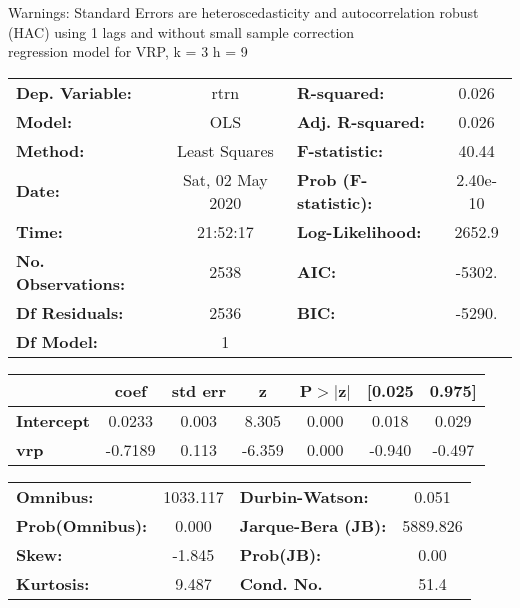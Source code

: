 Warnings: \newline
 [1] Standard Errors are heteroscedasticity and autocorrelation robust (HAC) using 1 lags and without small sample correction\\ 

regression model for VRP, k = 3 h = 9\begin{center}
\begin{tabular}{lclc}
\toprule
\textbf{Dep. Variable:}    &       rtrn       & \textbf{  R-squared:         } &     0.026   \\
\textbf{Model:}            &       OLS        & \textbf{  Adj. R-squared:    } &     0.026   \\
\textbf{Method:}           &  Least Squares   & \textbf{  F-statistic:       } &     40.44   \\
\textbf{Date:}             & Sat, 02 May 2020 & \textbf{  Prob (F-statistic):} &  2.40e-10   \\
\textbf{Time:}             &     21:52:17     & \textbf{  Log-Likelihood:    } &    2652.9   \\
\textbf{No. Observations:} &        2538      & \textbf{  AIC:               } &    -5302.   \\
\textbf{Df Residuals:}     &        2536      & \textbf{  BIC:               } &    -5290.   \\
\textbf{Df Model:}         &           1      & \textbf{                     } &             \\
\bottomrule
\end{tabular}
\begin{tabular}{lcccccc}
                   & \textbf{coef} & \textbf{std err} & \textbf{z} & \textbf{P$> |$z$|$} & \textbf{[0.025} & \textbf{0.975]}  \\
\midrule
\textbf{Intercept} &       0.0233  &        0.003     &     8.305  &         0.000        &        0.018    &        0.029     \\
\textbf{vrp}       &      -0.7189  &        0.113     &    -6.359  &         0.000        &       -0.940    &       -0.497     \\
\bottomrule
\end{tabular}
\begin{tabular}{lclc}
\textbf{Omnibus:}       & 1033.117 & \textbf{  Durbin-Watson:     } &    0.051  \\
\textbf{Prob(Omnibus):} &   0.000  & \textbf{  Jarque-Bera (JB):  } & 5889.826  \\
\textbf{Skew:}          &  -1.845  & \textbf{  Prob(JB):          } &     0.00  \\
\textbf{Kurtosis:}      &   9.487  & \textbf{  Cond. No.          } &     51.4  \\
\bottomrule
\end{tabular}
\end{center}

